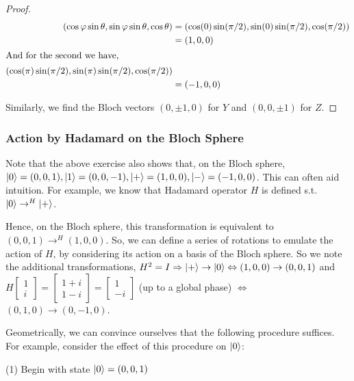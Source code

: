 \documentclass[main.tex]{subfiles}
\begin{document}
\begin{subappendices}
\begin{exercise}
\begin{proof}
	\begin{align*}
	(\cos \phi \sin \theta , \sin \phi \sin \theta, \cos \theta) &= (\cos (0)\sin (\pi / 2) , \sin (0)\sin (\pi / 2) , \cos (\pi / 2) ) \\
	&= (1, 0, 0) \\
	\intertext{And for the second we have,}	
	(\cos (\pi)\sin (\pi / 2) , \sin (\pi)\sin (\pi / 2) , \cos (\pi / 2) ) \\
	&= (-1, 0, 0)
	\end{align*}

Similarly, we find the Bloch vectors $(0, \pm 1, 0)$ for $Y$ and $(0, 0, \pm 1)$ for $Z$.
\end{proof}
\end{exercise}

\subsubsection{Action by Hadamard on the Bloch Sphere}\label{had:bloch}

Note that the above exercise also shows that, on the Bloch sphere, $\ket{0} = (0, 0, 1), \ket{1} = (0, 0 , -1), \ket{+} = (1, 0, 0), \ket{-} = (-1, 0, 0)$. This can often aid intuition. For example, we know that Hadamard operator $H$ is defined s.t. $\ket{0} \rightarrow^{H} \ket{+}$. 

Hence, on the Bloch sphere, this transformation is equivalent to $(0, 0, 1) \rightarrow^{H} (1, 0, 0)$. So, we can define a series of rotations to emulate the action of $H$, by considering its action on a basis of the Bloch sphere. So we note the additional transformations, $H^2 = I \implies \ket{+} \rightarrow \ket{0} \iff (1, 0, 0) \rightarrow (0, 0, 1)$ and $H \begin{bmatrix} 1 \\ i \end{bmatrix} = \begin{bmatrix} 1 + i \\ 1 - i \end{bmatrix} = \begin{bmatrix} 1 \\ -i \end{bmatrix}$ (up to a global phase) $\iff$ $(0, 1, 0) \rightarrow (0, -1, 0)$.

Geometrically, we can convince ourselves that the following procedure suffices. For example, consider the effect of this procedure on $\ket{0}$:

(1) Begin with state $\ket{0} = (0,0,1)$


\end{subappendices}
\end{document}

